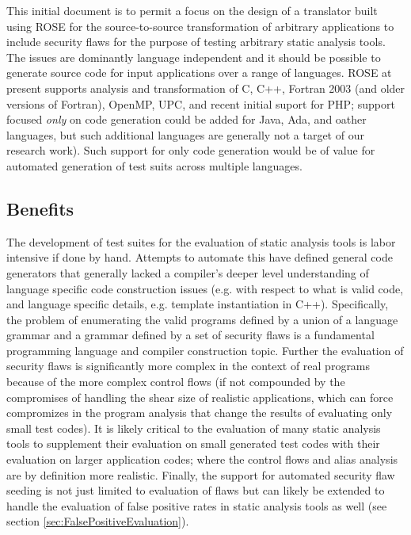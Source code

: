    This initial document is to permit a focus on the design of
a translator built using ROSE for the source-to-source transformation
of arbitrary applications to include security flaws for the purpose
of testing arbitrary static analysis tools.  The issues are dominantly
language independent and it should be possible to generate source
code for input applications over a range of languages.  ROSE at present supports
analysis and transformation of C, C++, Fortran 2003 (and older versions of Fortran), 
OpenMP, UPC, and recent initial suport for PHP; support focused {\em only} on code
generation could be added for Java, Ada, and oather languages, but such additional
languages are generally not a target of our research work). Such support for only code
generation would be of value for automated generation of test suits across multiple
languages.

\subsection{Benefits}
   The development of test suites for the evaluation of static analysis tools
is labor intensive if done by hand.  Attempts to automate this have defined general code
generators that generally lacked a compiler's deeper level understanding of 
language specific code construction issues (e.g. with respect to what is valid code,
and language specific details, e.g. template instantiation in C++).
Specifically, the problem of enumerating
the valid programs defined by a union of a language grammar and a grammar defined by 
a set of security flaws is a fundamental programming language and compiler construction
topic.  Further the evaluation of security flaws is significantly more complex in the
context of real programs because of the more complex control flows (if not compounded by
the compromises of handling the shear size of realistic applications, which can force 
compromizes in the program analysis that change the results of evaluating only small 
test codes).  It is likely
critical to the evaluation of many static analysis tools to supplement their evaluation on
small generated test codes with their evaluation on larger application codes; where
the control flows and alias analysis are by definition more realistic.  Finally, the
support for automated security flaw seeding is not just limited to evaluation of flaws but
can likely be extended to handle the evaluation of false positive rates in static analysis
tools as well (see section \ref{sec:FalsePositiveEvaluation}).

